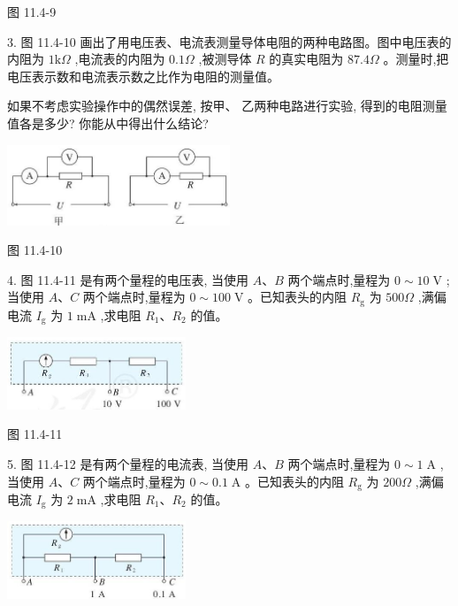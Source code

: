 \documentclass[10pt]{article}
\begin{document}
图 11.4-9

3. 图 11.4-10 画出了用电压表、电流表测量导体电阻的两种电路图。图中电压表的内阻为 \(1\mathrm{k}\Omega\) ,电流表的内阻为 \({0.1\Omega }\) ,被测导体 \(R\) 的真实电阻为 \({87.4\Omega }\) 。测量时,把电压表示数和电流表示数之比作为电阻的测量值。

如果不考虑实验操作中的偶然误差, 按甲、 乙两种电路进行实验, 得到的电阻测量值各是多少? 你能从中得出什么结论?

\begin{center}
\includegraphics[max width=0.5\textwidth]{images/01911d5f-8e38-70c0-b5b8-2b399bd115b6_76_661161.jpg}
\end{center}

图 11.4-10

4. 图 11.4-11 是有两个量程的电压表, 当使用 \(A\text{、}B\) 两个端点时,量程为 \(0 \sim {10}\mathrm{\;V}\) ; 当使用 \(A\text{、}C\) 两个端点时,量程为 \(0 \sim {100}\mathrm{\;V}\) 。已知表头的内阻 \({R}_{\mathrm{g}}\) 为 \({500\Omega }\) ,满偏电流 \({I}_{\mathrm{g}}\) 为 \(1\mathrm{\;{mA}}\) ,求电阻 \({R}_{1}\text{、}{R}_{2}\) 的值。

\begin{center}
\includegraphics[max width=0.4\textwidth]{images/01911d5f-8e38-70c0-b5b8-2b399bd115b6_76_420024.jpg}
\end{center}

图 11.4-11

5. 图 11.4-12 是有两个量程的电流表, 当使用 \(A\text{、}B\) 两个端点时,量程为 \(0 \sim 1\mathrm{\;A}\) ,当使用 \(A\text{、}C\) 两个端点时,量程为 \(0 \sim {0.1}\mathrm{\;A}\) 。已知表头的内阻 \({R}_{\mathrm{g}}\) 为 \({200\Omega }\) ,满偏电流 \({I}_{\mathrm{g}}\) 为 \(2\mathrm{\;{mA}}\) ,求电阻 \({R}_{1}\text{、}{R}_{2}\) 的值。

\begin{center}
\includegraphics[max width=0.4\textwidth]{images/01911d5f-8e38-70c0-b5b8-2b399bd115b6_76_244128.jpg}
\end{center}
\end{document}
